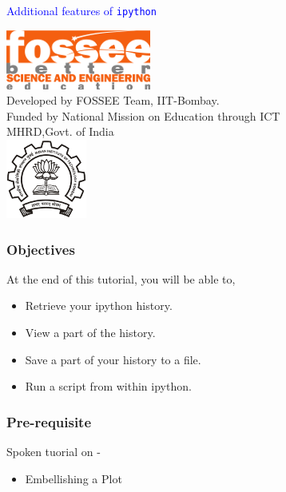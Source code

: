 \documentclass[presentation]{beamer}
\title{}
\author{FOSSEE}
\date{}
\begin{document}
\begin{frame}

\begin{center}
\vspace{12pt}
\textcolor{blue}{\huge Additional features of \texttt{ipython}}
\end{center}
\vspace{18pt}
\begin{center}
\vspace{10pt}
\includegraphics[scale=0.95]{../images/fossee-logo.png}\\
\vspace{5pt}
\scriptsize Developed by FOSSEE Team, IIT-Bombay. \\ 
\scriptsize Funded by National Mission on Education through ICT\\
\scriptsize  MHRD,Govt. of India\\
\includegraphics[scale=0.30]{../images/iitb-logo.png}\\
\end{center}
\end{frame}
\begin{frame}
\frametitle{Objectives}
\label{sec-2}

  At the end of this tutorial, you will be able to,
 

\begin{itemize}
\item Retrieve your ipython history.
\item View a part of the history.
\item Save a part of your history to a file.
\item Run a script from within ipython.
\end{itemize}
\end{frame}
\begin{frame}
\frametitle{Pre-requisite}
\label{sec-3}

  Spoken tuorial on -

\begin{itemize}
\item Embellishing a Plot
\end{itemize}
\end{frame}
\end{document}
